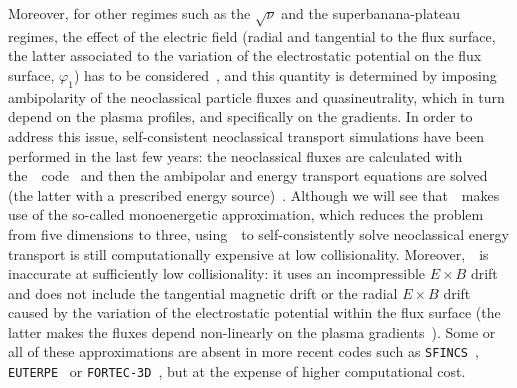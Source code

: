 Moreover, for other regimes such as the $\sqrt{\nu}$ and the superbanana-plateau regimes, the effect of the electric field (radial and tangential to the flux surface, the latter associated to the variation of the electrostatic potential on the flux surface, $\varphi_1$) has to be considered~\citep{calvo2017sqrtnu}, and this quantity is determined by imposing ambipolarity of the neoclassical particle fluxes and quasineutrality, which in turn depend on the plasma profiles, and specifically on the gradients. In order to address this issue, self-consistent neoclassical transport simulations have been performed in the last few years: the neoclassical fluxes are calculated with the~\DKES~code~\citep{hirshman1986dkes} and then the ambipolar and energy transport equations are solved (the latter with a prescribed energy source)~\citep{turkin2011predictive,geiger2014w7x}. Although we will see that~\DKES~makes use of the so-called monoenergetic approximation, which reduces the problem from five dimensions to three, using~\DKES~to self-consistently solve neoclassical energy transport is still computationally expensive at low collisionality. Moreover,~\DKES~is inaccurate at {sufficiently} low collisionality: it uses an incompressible $E\times B$ drift~\citep{beidler2007icnts} and does not include the tangential magnetic drift or the radial $E\!\times\!B$ drift caused by the variation of the electrostatic potential within the flux surface (the latter makes the fluxes depend non-linearly on the plasma gradients~\citep{calvo2018jpp}). Some or all of these approximations are absent in more recent codes such as \texttt{SFINCS}~\citep{landreman2014sfincs}, \texttt{EUTERPE}~\citep{regana2013euterpe,regana2017phi1} or \texttt{FORTEC-3D}~\citep{satake2006fortec3d}, but at the expense of higher computational cost.

